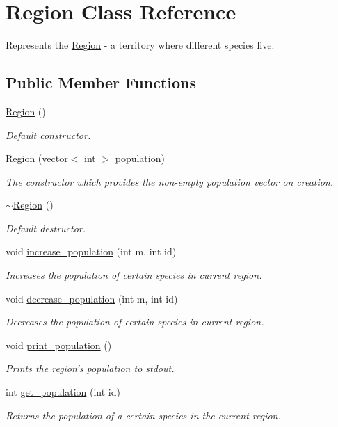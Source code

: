 \hypertarget{class_region}{\section{Region Class Reference}
\label{class_region}
}


Represents the \hyperlink{class_region}{Region} -\/ a territory where different species live.  


\subsection*{Public Member Functions}
\begin{DoxyCompactItemize}
\item 
\hyperlink{class_region_aa8796c9b4ac95da7f7ca4f374673800c}{Region} ()
\begin{DoxyCompactList}\small\item\em Default constructor. \end{DoxyCompactList}\item 
\hyperlink{class_region_ad60199ea545e7ceb0bb1b88b8f0d43f8}{Region} (vector$<$ int $>$ population)
\begin{DoxyCompactList}\small\item\em The constructor which provides the non-\/empty population vector on creation. \end{DoxyCompactList}\item 
\hyperlink{class_region_a3c3670fff78f7511d156e3b2f0bc6266}{$\sim$\-Region} ()
\begin{DoxyCompactList}\small\item\em Default destructor. \end{DoxyCompactList}\item 
void \hyperlink{class_region_af822042e4b63e01b87e483fbabf2987d}{increase\-\_\-population} (int m, int id)
\begin{DoxyCompactList}\small\item\em Increases the population of certain species in current region. \end{DoxyCompactList}\item 
void \hyperlink{class_region_a38a911f9e1034421fd3706064385e4c5}{decrease\-\_\-population} (int m, int id)
\begin{DoxyCompactList}\small\item\em Decreases the population of certain species in current region. \end{DoxyCompactList}\item 
void \hyperlink{class_region_a0f651d194c71d11f7b85185c582b9a4d}{print\-\_\-population} ()
\begin{DoxyCompactList}\small\item\em Prints the region's population to stdout. \end{DoxyCompactList}\item 
int \hyperlink{class_region_a0a54bec22f7a6d7bd9025340544529ef}{get\-\_\-population} (int id)
\begin{DoxyCompactList}\small\item\em Returns the population of a certain species in the current region. \end{DoxyCompactList}\end{DoxyCompactItemize}



